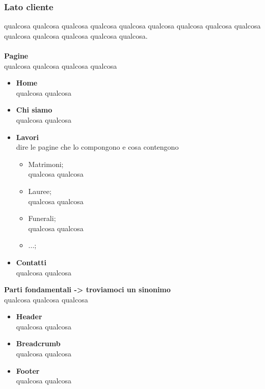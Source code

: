 \subsubsection{Lato cliente}
qualcosa qualcosa qualcosa qualcosa qualcosa qualcosa qualcosa qualcosa qualcosa qualcosa qualcosa qualcosa qualcosa qualcosa.\\\\
\textbf{Pagine}\\
qualcosa qualcosa qualcosa qualcosa	
	\begin{itemize}
		\item \textbf{Home} \\qualcosa qualcosa
		\item \textbf{Chi siamo}\\qualcosa qualcosa
		\item \textbf{Lavori}\\dire le pagine che lo compongono e cosa contengono
	 	\begin{itemize}
 			\item Matrimoni;\\	qualcosa qualcosa 
	 		\item Lauree;\\	qualcosa qualcosa 
 			\item Funerali;\\	qualcosa qualcosa
 			\item ...; 		 		
	 	\end{itemize}
	 	\item \textbf{Contatti}\\qualcosa qualcosa\\
 	\end{itemize}
\textbf{Parti fondamentali -> troviamoci un sinonimo}\\ 
	qualcosa qualcosa qualcosa
	\begin{itemize}
		\item \textbf{Header}\\qualcosa qualcosa
		\item \textbf{Breadcrumb}\\qualcosa qualcosa
		\item \textbf{Footer}\\qualcosa qualcosa
 	\end{itemize}
 		
